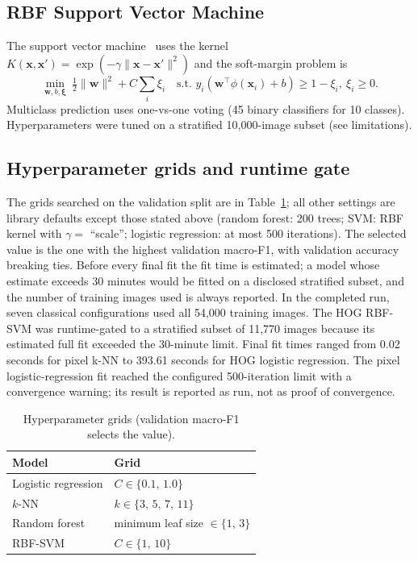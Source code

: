 \subsection{RBF Support Vector Machine}
The support vector machine~\cite{cortes1995support} uses the kernel $K(\mathbf{x},\mathbf{x}')=\exp(-\gamma\lVert \mathbf{x}-\mathbf{x}'\rVert^2)$ and the soft-margin problem is
\begin{equation}
\min_{\mathbf{w},b,\boldsymbol{\xi}}\ \tfrac12\lVert \mathbf{w}\rVert^2 + C\sum_i \xi_i
\quad \text{s.t. } y_i(\mathbf{w}^{\top}\phi(\mathbf{x}_i)+b)\ge 1-\xi_i,\ \xi_i\ge 0 .
\end{equation}
Multiclass prediction uses one-vs-one voting (45 binary classifiers for 10 classes).
Hyperparameters were tuned on a stratified 10{,}000-image subset (see limitations).

\subsection{Hyperparameter grids and runtime gate}
The grids searched on the validation split are in Table~\ref{tab:grids}; all other settings are library defaults
except those stated above (random forest: 200 trees; SVM: RBF kernel with $\gamma=$ ``scale''; logistic regression:
at most 500 iterations). The selected value is the one with the highest validation macro-F1, with validation accuracy
breaking ties. Before every final fit the fit time is estimated; a model whose estimate exceeds 30 minutes would be
fitted on a disclosed stratified subset, and the number of training images used is always reported. In the completed run, seven classical configurations used all 54,000 training images. The HOG RBF-SVM was runtime-gated to a stratified subset of 11,770 images because its estimated full fit exceeded the 30-minute limit. Final fit times ranged from 0.02 seconds for pixel k-NN to 393.61 seconds for HOG logistic regression. The pixel logistic-regression fit reached the configured 500-iteration limit with a convergence warning; its result is reported as run, not as proof of convergence.

\begin{table}[t]
\centering
\caption{Hyperparameter grids (validation macro-F1 selects the value).}
\label{tab:grids}
\footnotesize
\begin{tabular}{ll}
\toprule
Model & Grid \\
\midrule
Logistic regression & $C\in\{0.1,\,1.0\}$ \\
$k$-NN & $k\in\{3,\,5,\,7,\,11\}$ \\
Random forest & minimum leaf size $\in\{1,\,3\}$ \\
RBF-SVM & $C\in\{1,\,10\}$ \\
\bottomrule
\end{tabular}
\end{table}
